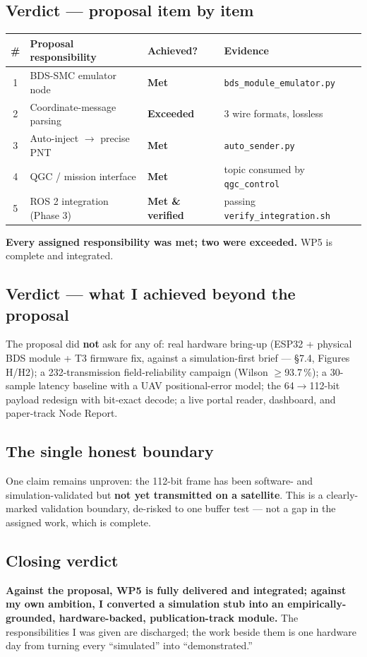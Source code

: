 \documentclass[11pt,a4paper]{article}
\begin{document}
\subsection{Verdict --- proposal item by item}
\begin{longtable}{@{}c p{6.2cm} p{2.6cm} p{3.0cm}@{}}
\toprule
\textbf{\#} & \textbf{Proposal responsibility} & \textbf{Achieved?} & \textbf{Evidence} \\
\midrule
\endhead
1 & BDS-SMC emulator node & \textbf{\color{good}Met} & \texttt{bds\_module\_emulator.py} \\
2 & Coordinate-message parsing & \textbf{\color{good}Exceeded} & 3 wire formats, lossless \\
3 & Auto-inject $\to$ precise PNT & \textbf{\color{good}Met} & \texttt{auto\_sender.py} \\
4 & QGC / mission interface & \textbf{\color{good}Met} & topic consumed by \texttt{qgc\_control} \\
5 & ROS 2 integration (Phase 3) & \textbf{\color{good}Met \& verified} & passing \texttt{verify\_integration.sh} \\
\bottomrule
\end{longtable}
\textbf{Every assigned responsibility was met; two were exceeded.} WP5 is complete and integrated.

\subsection{Verdict --- what I achieved beyond the proposal}
The proposal did \textbf{not} ask for any of: real hardware bring-up (ESP32 + physical BDS
module + T3 firmware fix, against a simulation-first brief --- \S7.4, Figures H/H2); a
232-transmission field-reliability campaign (Wilson $\ge$93.7\,\%); a 30-sample latency
baseline with a UAV positional-error model; the 64$\to$112-bit payload redesign with
bit-exact decode; a live portal reader, dashboard, and paper-track Node Report.

\subsection{The single honest boundary}
One claim remains unproven: the 112-bit frame has been software- and simulation-validated but
\textbf{not yet transmitted on a satellite}. This is a clearly-marked validation boundary,
de-risked to one buffer test --- not a gap in the assigned work, which is complete.

\subsection{Closing verdict}
\begin{callout}
\textbf{Against the proposal, WP5 is fully delivered and integrated; against my own ambition,
I converted a simulation stub into an empirically-grounded, hardware-backed,
publication-track module.} The responsibilities I was given are discharged; the work beside
them is one hardware day from turning every ``simulated'' into ``demonstrated.''
\end{callout}
\end{document}

